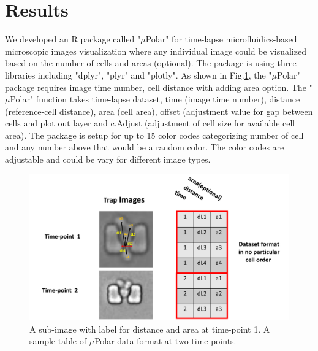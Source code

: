 \documentclass[conference]{IEEEtran}
\begin{document}
 


\section{Results}

We developed an R package called "$\mu$Polar" for time-lapse microfluidics-based microscopic images visualization where any individual image could be visualized based on the number of cells and areas (optional). The package is using three libraries including "dplyr", "plyr" and "plotly". As shown in Fig.\ref{fig:table}, the "$\mu$Polar" package requires image time number, cell distance with adding area option. The "$\mu$Polar" function takes time-lapse dataset, time (image time number), distance (reference-cell distance), area (cell area), offset (adjustment value for gap between cells and plot out layer and c.Adjust (adjustment of cell size for available cell area). The package is setup for up to 15 color codes categorizing number of cell and any number above that would be a random color. The color codes are adjustable and could be vary for different image types. 

\begin{figure}
\centering
\includegraphics[width=\textwidth,height=10 cm]{Patterns/table.pdf}
\caption{ A sub-image with label for distance and area at time-point 1. A sample table of $\mu$Polar data format at two time-points.}
\label{fig:table}
\end{figure}
\end{document}
